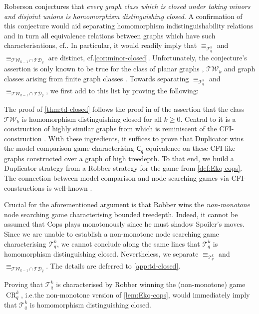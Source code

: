 \documentclass[10pt,a4paper]{article}
\newcommand{\Ekq}{\ensuremath{\mathcal{T}_{q}^{k}}}
\DeclareMathOperator{\CR}{CR}
\begin{document}
Roberson conjectures that \emph{every graph class which is closed under taking minors and disjoint unions is homomorphism distinguishing closed}. A confirmation of this conjecture would aid separating homomorphism indistinguishability relations and in turn all equivalence relations between graphs which have such characterisations, cf.\@ \cite{roberson_lasserre_2023}. 
In particular, it would readily imply that $\equiv_{\Ekq}$ and $\equiv_{\mathcal{TW}_{k-1} \cap \mathcal{TD}_q}$ are distinct, cf.\@ \cref{cor:minor-closed}.
Unfortunately, the conjecture's assertion is only known to be true for the class of planar graphs \cite{roberson_oddomorphisms_2022}, $\mathcal{TW}_k$ \cite{neuen_homomorphism-distinguishing_2023} and graph classes arising from finite graph classes \cite{seppelt_logical_2023}.
Towards separating $\equiv_{\Ekq}$ and $\equiv_{\mathcal{TW}_{k-1} \cap \mathcal{TD}_q}$, we first add to this list by proving the following:

\tdclosed*

The proof of \cref{thm:td-closed} follows the proof in \cite{neuen_homomorphism-distinguishing_2023} of the assertion that the class $\mathcal{TW}_{k}$ is homomorphism distinguishing closed for all $k \geq 0$.
Central to it is a construction of highly similar graphs from \cite{roberson_oddomorphisms_2022} which is reminiscent of the CFI-construction \cite{cai_optimal_1992}. 
With these ingredients, it suffices to prove that Duplicator wins the model comparison game characterising $\mathsf{C}_q$-equivalence on these CFI-like graphs constructed over a graph of high treedepth. To that end, we build a Duplicator strategy from a Robber strategy for the game from \cref{def:Ekq-cops}.
The connection between model comparison and node searching games via CFI-constructions is well-known \cite{hella_logical_1996,dawar_power_2007}.


Crucial for the aforementioned argument is that Robber wins the \emph{non-monotone} node searching game characterising bounded treedepth. Indeed, it cannot be assumed that Cops plays monotonously since he must shadow Spoiler's moves. Since we are unable to establish a non-monotone node searching game characterising $\Ekq$, we cannot conclude along the same lines that $\Ekq$ is homomorphism distinguishing closed. Nevertheless, we separate $\equiv_{\Ekq}$ and $\equiv_{\mathcal{TW}_{k-1} \cap \mathcal{TD}_q}$.
The details are deferred to \cref{app:td-closed}.
\ekqtwtdsemantics*

Proving that $\Ekq$ is characterised by Robber winning the (non-monotone) game $\CR_q^k$, i.e.\@ the non-monotone version of \cref{lem:Ekq-cops}, would immediately imply that $\Ekq$ is homomorphism distinguishing closed. 
\end{document}
